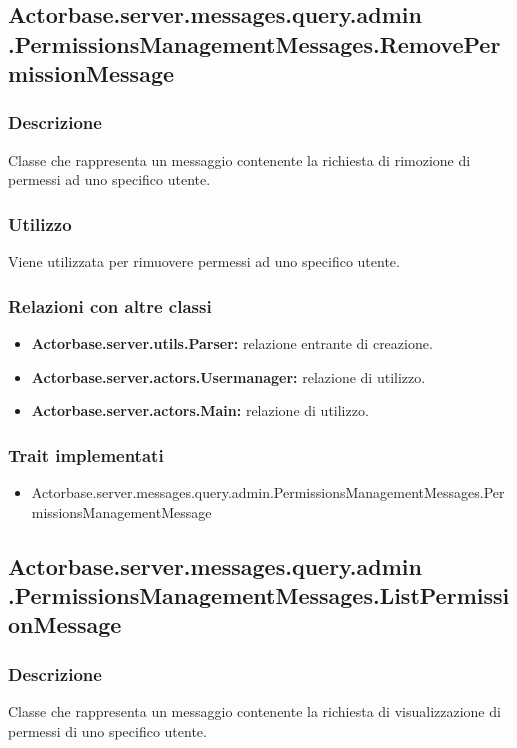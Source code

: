 \documentclass[a4paper]{article}
\begin{document}
		\subsection{Actorbase.server.messages.query.admin \newline
		.PermissionsManagementMessages.RemovePermissionMessage}
			\subsubsection{Descrizione}
				Classe che rappresenta un messaggio contenente la richiesta di rimozione di permessi ad uno specifico utente.
				
			\subsubsection{Utilizzo}
				Viene utilizzata per rimuovere permessi ad uno specifico utente.
				
			\subsubsection{Relazioni con altre classi}
				\begin{itemize}
					\item \textbf{Actorbase.server.utils.Parser:} relazione entrante di creazione.
					\item \textbf{Actorbase.server.actors.Usermanager:} relazione di utilizzo.
					\item \textbf{Actorbase.server.actors.Main:} relazione di utilizzo.
				\end{itemize}
			\subsubsection{Trait implementati}
				\begin{itemize}
					\item Actorbase.server.messages.query.admin.PermissionsManagementMessages.PermissionsManagementMessage
				\end{itemize}
				
		\subsection{Actorbase.server.messages.query.admin \newline
		.PermissionsManagementMessages.ListPermissionMessage}
			\subsubsection{Descrizione}
				Classe che rappresenta un messaggio contenente la richiesta di visualizzazione di permessi di uno specifico utente.
				
\end{document}
